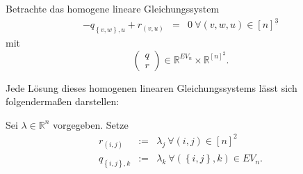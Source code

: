\documentclass[10p,a4paper,BCOR = 12mm, DIV=15]{scrbook}
\begin{document}
\begin{Le}
\label{le:kern}
Betrachte das homogene lineare Gleichungssystem
\begin{eqnarray}
-q_{\left\{v, w\right\}, u} + r_{\left(v, u\right)} & = & 0\ \forall \left(v, w, u\right)\in [n]^{\underline{3}}  \label{eq:le_kern}
\end{eqnarray}
mit
\begin{displaymath}
\left(\begin{array}{c}
q \\
r
\end{array}\right) \in \mathbb{R}^{EV_n}\times \mathbb{R}^{[n]^{\underline{2}}}.
\end{displaymath}

Jede Lösung dieses homogenen linearen Gleichungssystems lässt sich folgendermaßen darstellen:

Sei $\lambda\in\mathbb{R}^n$ vorgegeben. Setze
\begin{eqnarray}
r_{\left(i, j\right)} & := & \lambda_j\ \forall \left(i, j\right)\in\left[n\right]^2  \label{eq:le_kern_r_final} \\
q_{\left\{i, j\right\},k} & := & \lambda_k\ \forall \left(\left\{i, j\right\}, k\right)\in EV_n. \label{eq:le_kern_q_final}
\end{eqnarray}
\end{Le}
\end{document}

